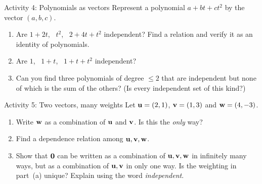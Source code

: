 \documentclass[11pt]{article}
\begin{document}
\begin{ext}{Activity 4: Polynomials as vectors}{}
Represent a polynomial $a+bt+ct^2$ by the vector $(a,b,c)$.
\begin{enumerate}[label=(\alph*),itemsep=6pt]
  \item Are $1+2t$, \ $t^2$, \ $2+4t+t^2$ independent? Find a relation and verify it as an identity of polynomials.
  \item Are $1$, \ $1+t$, \ $1+t+t^2$ independent?
  \item Can you find three polynomials of degree $\le2$ that are independent but none of which is the sum of the others? (Is every independent set of this kind?)
\end{enumerate}
\workspace{1.8in}
\end{ext}

\begin{ext}{Activity 5: Two vectors, many weights}{}
Let $\mathbf{u}=(2,1)$, $\mathbf{v}=(1,3)$ and $\mathbf{w}=(4,-3)$.
\begin{enumerate}[label=(\alph*),itemsep=6pt]
  \item Write $\mathbf{w}$ as a combination of $\mathbf{u}$ and $\mathbf{v}$. Is this the \emph{only} way?
  \item Find a dependence relation among $\mathbf{u},\mathbf{v},\mathbf{w}$.
  \item Show that $\mathbf{0}$ can be written as a combination of $\mathbf{u},\mathbf{v},\mathbf{w}$ in infinitely many ways, but as a combination of $\mathbf{u},\mathbf{v}$ in only one way. Is the weighting in part~(a) unique? Explain using the word \emph{independent}.
\end{enumerate}
\workspace{1.5in}
\end{ext}
\end{document}
